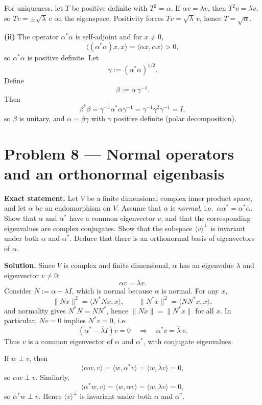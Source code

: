 \documentclass[12pt,a4paper]{article}
\theoremstyle{plain}
\theoremstyle{definition}      %
\begin{document}
For uniqueness, let $T$ be positive definite with $T^2=\alpha$.
If $\alpha v=\lambda v$, then $T^2v=\lambda v$, so $Tv=\pm\sqrt{\lambda}\,v$ on the eigenspace.
Positivity forces $Tv=\sqrt{\lambda}\,v$, hence $T=\sqrt{\alpha}$.

\textbf{(ii)} The operator $\alpha^*\alpha$ is self-adjoint and for $x\neq 0$,
\[
\langle (\alpha^*\alpha)x,x\rangle=\langle \alpha x,\alpha x\rangle>0,
\]
so $\alpha^*\alpha$ is positive definite. Let
\[
\gamma:=(\alpha^*\alpha)^{1/2}.
\]
Define
\[
\beta:=\alpha\,\gamma^{-1}.
\]
Then
\[
\beta^*\beta=\gamma^{-1}\alpha^*\alpha\gamma^{-1}=\gamma^{-1}\gamma^2\gamma^{-1}=I,
\]
so $\beta$ is unitary, and $\alpha=\beta\gamma$ with $\gamma$ positive definite (polar decomposition).


\section{Problem 8 — Normal operators and an orthonormal eigenbasis}

\textbf{Exact statement.}
Let $V$ be a finite dimensional complex inner product space, and let $\alpha$ be an endomorphism on $V$.
Assume that $\alpha$ is \emph{normal}, i.e.\ $\alpha\alpha^*=\alpha^*\alpha$.
Show that $\alpha$ and $\alpha^*$ have a common eigenvector $v$, and that the corresponding eigenvalues are complex conjugates.
Show that the subspace $\langle v\rangle^\perp$ is invariant under both $\alpha$ and $\alpha^*$.
Deduce that there is an orthonormal basis of eigenvectors of $\alpha$.

\textbf{Solution.}
Since $V$ is complex and finite dimensional, $\alpha$ has an eigenvalue $\lambda$ and eigenvector $v\neq 0$:
\[
\alpha v=\lambda v.
\]
Consider $N:=\alpha-\lambda I$, which is normal because $\alpha$ is normal.
For any $x$,
\[
\|Nx\|^2=\langle N^*Nx,x\rangle,\qquad \|N^*x\|^2=\langle NN^*x,x\rangle,
\]
and normality gives $N^*N=NN^*$, hence $\|Nx\|=\|N^*x\|$ for all $x$.
In particular, $Nv=0$ implies $N^*v=0$, i.e.
\[
(\alpha^*-\overline{\lambda}I)v=0 \quad\Rightarrow\quad \alpha^*v=\overline{\lambda}\,v.
\]
Thus $v$ is a common eigenvector of $\alpha$ and $\alpha^*$, with conjugate eigenvalues.

If $w\perp v$, then
\[
\langle \alpha w,v\rangle=\langle w,\alpha^*v\rangle=\langle w,\overline{\lambda}v\rangle=0,
\]
so $\alpha w\perp v$. Similarly,
\[
\langle \alpha^* w,v\rangle=\langle w,\alpha v\rangle=\langle w,\lambda v\rangle=0,
\]
so $\alpha^*w\perp v$. Hence $\langle v\rangle^\perp$ is invariant under both $\alpha$ and $\alpha^*$.
\end{document}

